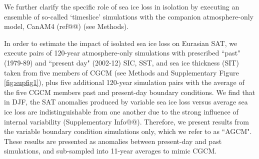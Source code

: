 \documentclass{nature}
\begin{document}
We further clarify the specific role of sea ice loss in isolation by executing an ensemble of so-called `timeslice' simulations with the companion atmosphere-only model, CanAM4 (ref@@) (see Methods).


In order to estimate the impact of isolated sea ice loss on Eurasian SAT, we execute pairs of 120-year atmosphere-only simulations with prescribed ``past" (1979-89) and ``present day" (2002-12) SIC, SST, and sea ice thickness (SIT) taken from five members of CGCM (see Methods and Supplementary Figure \ref{fig:supfig1}), plus five additional 120-year simulation pairs with the average of the five CGCM members past and present-day boundary conditions. We find that in DJF, the SAT anomalies produced by variable sea ice loss versus average sea ice loss are indistinguishable from one another due to the strong influence of internal variability (Supplementary Info@@). Therefore, we present results from the variable boundary condition simulations only, which we refer to as ``AGCM". These results are presented as anomalies between present-day and past simulations, and sub-sampled into 11-year averages to mimic CGCM.





\end{document}
